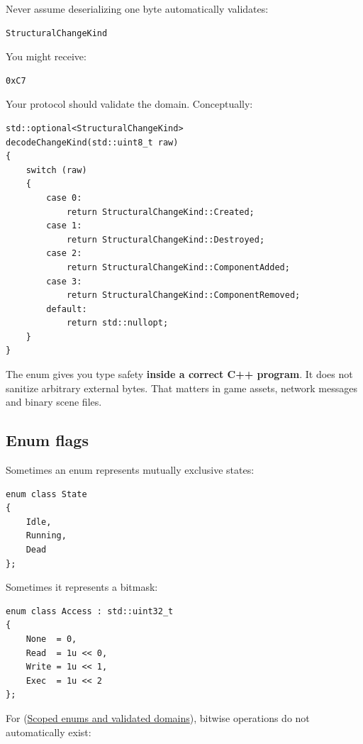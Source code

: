 \hypertarget{01-foundations-i-ch002-an-enum-can-represent-more-than-just-the-named-enumerators}{}

Never assume deserializing one byte automatically validates:

\begin{verbatim}
StructuralChangeKind
\end{verbatim}

You might receive:

\begin{verbatim}
0xC7
\end{verbatim}

Your protocol should validate the domain. Conceptually:

\begin{verbatim}
std::optional<StructuralChangeKind>
decodeChangeKind(std::uint8_t raw)
{
    switch (raw)
    {
        case 0:
            return StructuralChangeKind::Created;
        case 1:
            return StructuralChangeKind::Destroyed;
        case 2:
            return StructuralChangeKind::ComponentAdded;
        case 3:
            return StructuralChangeKind::ComponentRemoved;
        default:
            return std::nullopt;
    }
}
\end{verbatim}

The enum gives you type safety \textbf{inside a correct C++ program}. It does not sanitize arbitrary external bytes. That matters in game assets, network messages and binary scene files.

\subsection{Enum flags}\label{01-foundations-i-ch002-enum-flags}

\hypertarget{01-foundations-i-ch002-enum-flags}{}

Sometimes an enum represents mutually exclusive states:

\begin{verbatim}
enum class State
{
    Idle,
    Running,
    Dead
};
\end{verbatim}

Sometimes it represents a bitmask:

\begin{verbatim}
enum class Access : std::uint32_t
{
    None  = 0,
    Read  = 1u << 0,
    Write = 1u << 1,
    Exec  = 1u << 2
};
\end{verbatim}

For  (\hyperref[appendix-23640fcee147]{Scoped enums and validated domains}), bitwise operations do not automatically exist:

